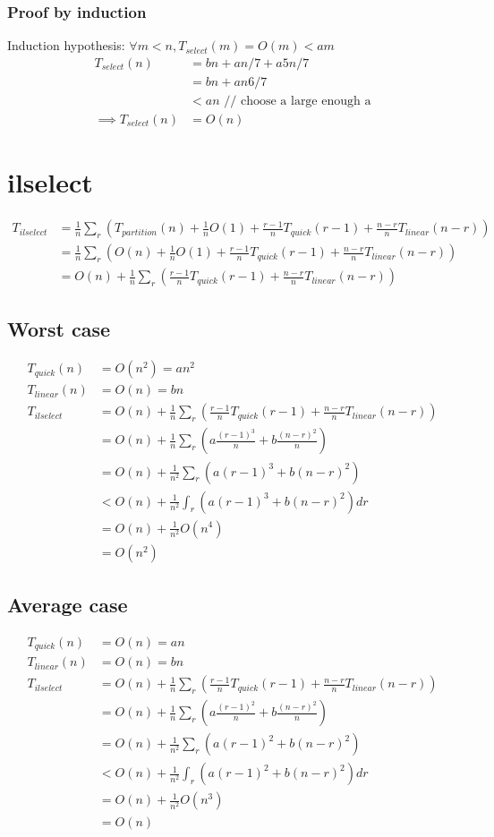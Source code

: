 \documentclass{article}
\begin{document}
\subsubsection{Proof by induction}
Induction hypothesis: $\forall m < n, T_{select}(m) = O(m) < am$
\begin{align*}
T_{select}(n)
&= bn + an/7 + a5n/7\\
&= bn + an6/7\\
&< an \text{ // choose a large enough a}\\
\implies T_{select}(n) &= O(n)
\end{align*}
\section{ilselect}
\begin{align*}
T_{ilselect}
&= \frac{1}{n} \sum_r (T_{partition}(n) + \frac{1}{n}O(1) +
\frac{r-1}{n}T_{quick}(r-1) + \frac{n-r}{n}T_{linear}(n-r))\\
&= \frac{1}{n} \sum_r (O(n) + \frac{1}{n}O(1) + \frac{r-1}{n}T_{quick}(r-1) +
\frac{n-r}{n}T_{linear}(n-r))\\
&= O(n) + \frac{1}{n} \sum_r (\frac{r-1}{n}T_{quick}(r-1) +
\frac{n-r}{n}T_{linear}(n-r))
\end{align*}
\subsection{Worst case}
\begin{align*}
T_{quick}(n) &= O(n^2) = an^2\\
T_{linear}(n) &= O(n) = bn\\
T_{ilselect}
&= O(n) + \frac{1}{n} \sum_r (\frac{r-1}{n}T_{quick}(r-1) +
\frac{n-r}{n}T_{linear}(n-r))\\
&= O(n) + \frac{1}{n} \sum_r (a\frac{(r-1)^3}{n} + b\frac{(n-r)^2}{n})\\
&= O(n) + \frac{1}{n^2} \sum_r (a(r-1)^3 + b(n-r)^2)\\
&< O(n) + \frac{1}{n^2} \int_r (a(r-1)^3 + b(n-r)^2)dr\\
&= O(n) + \frac{1}{n^2} O(n^4)\\
&= O(n^2)
\end{align*}
\subsection{Average case}
\begin{align*}
T_{quick}(n) &= O(n) = an\\
T_{linear}(n) &= O(n) = bn\\
T_{ilselect}
&= O(n) + \frac{1}{n} \sum_r (\frac{r-1}{n}T_{quick}(r-1) +
\frac{n-r}{n}T_{linear}(n-r))\\
&= O(n) + \frac{1}{n} \sum_r (a\frac{(r-1)^2}{n} + b\frac{(n-r)^2}{n})\\
&= O(n) + \frac{1}{n^2} \sum_r (a(r-1)^2 + b(n-r)^2)\\
&< O(n) + \frac{1}{n^2} \int_r (a(r-1)^2 + b(n-r)^2)dr\\
&= O(n) + \frac{1}{n^2} O(n^3)\\
&= O(n)
\end{align*}
\end{document}
